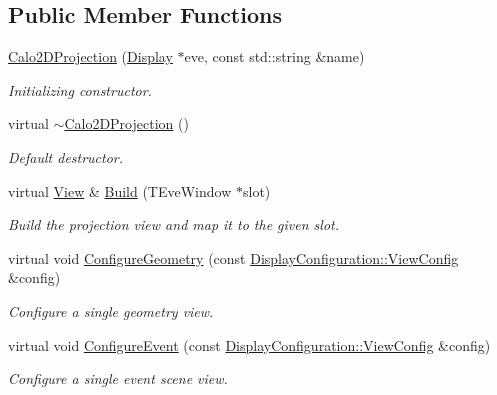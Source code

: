 \subsection*{Public Member Functions}
\begin{DoxyCompactItemize}
\item 
\hyperlink{class_d_d4hep_1_1_calo2_d_projection_a80436525b8087ffb14aa82b06b8059cb}{Calo2DProjection} (\hyperlink{class_d_d4hep_1_1_display}{Display} $\ast$eve, const std::string \&name)
\begin{DoxyCompactList}\small\item\em Initializing constructor. \item\end{DoxyCompactList}\item 
virtual \hyperlink{class_d_d4hep_1_1_calo2_d_projection_a955a146f1ac77e119979af591dd3fe71}{$\sim$Calo2DProjection} ()
\begin{DoxyCompactList}\small\item\em Default destructor. \item\end{DoxyCompactList}\item 
virtual \hyperlink{class_d_d4hep_1_1_view}{View} \& \hyperlink{class_d_d4hep_1_1_calo2_d_projection_a4ac47f2293dd1af3b2dc1b6311edb170}{Build} (TEveWindow $\ast$slot)
\begin{DoxyCompactList}\small\item\em Build the projection view and map it to the given slot. \item\end{DoxyCompactList}\item 
virtual void \hyperlink{class_d_d4hep_1_1_calo2_d_projection_aabf1a03b64b1baad596aaa9349e3cbea}{ConfigureGeometry} (const \hyperlink{class_d_d4hep_1_1_display_configuration_1_1_view_config}{DisplayConfiguration::ViewConfig} \&config)
\begin{DoxyCompactList}\small\item\em Configure a single geometry view. \item\end{DoxyCompactList}\item 
virtual void \hyperlink{class_d_d4hep_1_1_calo2_d_projection_ab49fa4071160750bd2c82e68b2f6d524}{ConfigureEvent} (const \hyperlink{class_d_d4hep_1_1_display_configuration_1_1_view_config}{DisplayConfiguration::ViewConfig} \&config)
\begin{DoxyCompactList}\small\item\em Configure a single event scene view. \item\end{DoxyCompactList}\item 

\end{DoxyCompactItemize}
